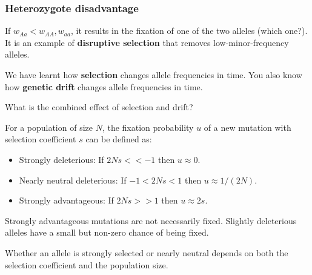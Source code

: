\documentclass{beamer}
\newcommand{\1}{\ensuremath{\mathbf{1}}}
\begin{document}
%
%
%
\begin{frame}\frametitle{Heterozygote disadvantage}
	If $w_{Aa} < w_{AA}, w_{aa}$, it results in the fixation of one of the two alleles (which one?).\\[2ex]
	It is an example of \textbf{disruptive selection} that removes low-minor-frequency alleles.
\end{frame}
%
%
%
\begin{frame}
	We have learnt how \textbf{selection} changes allele frequencies in time. You also know how \textbf{genetic drift} changes allele frequencies in time.
	\begin{block}{}
		What is the combined effect of selection and drift?
	\end{block}
\end{frame}
%
%
%
\begin{frame}
	For a population of size $N$, the fixation probability $u$ of a new mutation with selection coefficient $s$ can be defined as:
	\begin{itemize}
		\item Strongly deleterious: If $2Ns << -1$ then $u \approx 0$.
		\item Nearly neutral deleterious: If $-1 < 2Ns < 1$ then $u \approx 1/(2N)$.
		\item Strongly advantageous: If $2Ns >> 1$ then $u \approx 2s$.
	\end{itemize}
\end{frame}
%
%
%
\begin{frame}
	\begin{block}{}
		Strongly advantageous mutations are not necessarily fixed. Slightly deleterious alleles have a small but non-zero chance of being fixed.
	\end{block}
	\vspace{2ex}
	\begin{block}{}
		Whether an allele is strongly selected or nearly neutral depends on both the selection coefficient and the population size.
	\end{block}
\end{frame}
\end{document}
